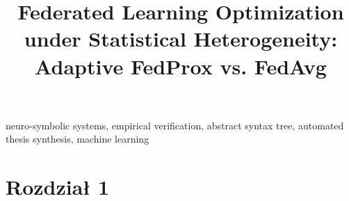 \documentclass[conference]{IEEEtran}
\begin{document}
\title{Federated Learning Optimization under Statistical Heterogeneity: Adaptive FedProx vs. FedAvg}

\author{
}

\maketitle
\thispagestyle{plain}

\begin{abstract}

\end{abstract}

\begin{IEEEkeywords}
neuro-symbolic systems, empirical verification, abstract syntax tree, automated thesis synthesis, machine learning
\end{IEEEkeywords}

\section{Rozdział 1}



\nocite{*}


\end{document}

